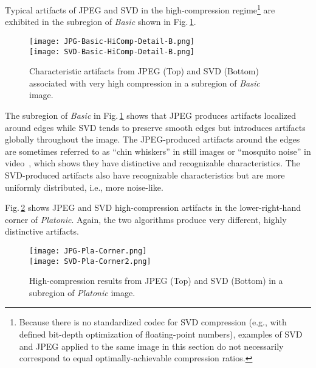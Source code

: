 \documentclass{article}
\begin{document}
Typical artifacts of JPEG and SVD in the high-compression
regime\footnote{Because there is no standardized codec
for SVD compression (e.g., with defined bit-depth optimization
of floating-point numbers), examples of SVD and JPEG applied
to the same image in this section do not necessarily 
correspond to equal optimally-achievable compression ratios.} 
are exhibited in the 
subregion of {\em Basic} shown in Fig.\,\ref{jpgsvd}.
\begin{figure}
   \centering
   \texttt{[image: JPG-Basic-HiComp-Detail-B.png]}\\ \vspace{3pt}
   \texttt{[image: SVD-Basic-HiComp-Detail-B.png]}
\caption{Characteristic artifacts from JPEG (Top) and SVD (Bottom) associated
with very high compression in a subregion of {\em Basic} image.}
\label{jpgsvd}
\end{figure}

The subregion of {\em Basic} in Fig.\,\ref{jpgsvd} shows that JPEG
produces artifacts localized around edges while SVD tends
to preserve smooth edges but introduces artifacts 
globally throughout the image. The JPEG-produced artifacts
around the edges are sometimes referred to as ``chin
whiskers'' in still images or ``mosquito noise'' in video~\cite{ITU}, 
which shows they
have distinctive and recognizable characteristics. The
SVD-produced artifacts also have recognizable characteristics
but are more uniformly distributed, i.e., more noise-like.


Fig.\,\ref{hcjpgsvd} shows JPEG and SVD high-compression artifacts 
in the lower-right-hand corner of {\em Platonic}. Again, the two
algorithms produce very different, highly distinctive artifacts. 
\begin{figure}
   \centering
   \texttt{[image: JPG-Pla-Corner.png]}\\ \vspace{3pt}
   \texttt{[image: SVD-Pla-Corner2.png]}
\caption{High-compression results from JPEG (Top) and SVD (Bottom) 
in a subregion of {\em Platonic} image.}
\label{hcjpgsvd}
\end{figure}
\end{document}

